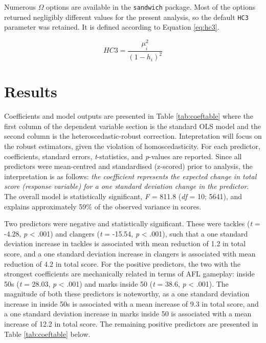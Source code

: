 \documentclass{article}
\begin{document}
Numerous \(\Omega\) options are available in the \texttt{sandwich} package. Most of the options returned negligibly different values for the present analysis, so the default \texttt{HC3} parameter was retained. It is defined according to Equation \eqref{eq:hc3}.

\begin{equation}
HC3 = \frac{\mu^{2}_{\hat{i}}}{(1-h_{i})^{2}} \label{eq:hc3}
\end{equation}

\hypertarget{results}{%
\section{Results}\label{results}}

Coefficients and model outputs are presented in Table \ref{tab:coeftable} where the first column of the dependent variable section is the standard OLS model and the second column is the heteroscedastic-robust correction. Intepretation will focus on the robust estimators, given the violation of homoscedasticity. For each predictor, coefficients, standard errors, \emph{t}-statistics, and \emph{p}-values are reported. Since all predictors were mean-centred and standardised (z-scored) prior to analysis, the interpretation is as follows: \emph{the coefficient represents the expected change in total score (response variable) for a one standard deviation change in the predictor}. The overall model is statistically significant, \emph{F} = 811.8 (\emph{df} = 10; 5641), and explains approximately 59\% of the observed variance in scores.

Two predictors were negative and statistically significant. These were tackles (\emph{t} = -4.28, \emph{p} \textless{} .001) and clangers (\emph{t} = -15.54, \emph{p} \textless{} .001), such that a one standard deviation increase in tackles is associated with mean reduction of 1.2 in total score, and a one standard deviation increase in clangers is associated with mean reduction of 4.2 in total score. For the positive predictors, the two with the strongest coefficients are mechanically related in terms of AFL gameplay: inside 50s (\emph{t} = 28.03, \emph{p} \textless{} .001) and marks inside 50 (\emph{t} = 38.6, \emph{p} \textless{} .001). The magnitude of both these predictors is noteworthy, as a one standard deviation increase in inside 50s is associated with a mean increase of 9.3 in total score, and a one standard deviation increase in marks inside 50 is associated with a mean increase of 12.2 in total score. The remaining positive predictors are presented in Table \ref{tab:coeftable} below.
\end{document}
